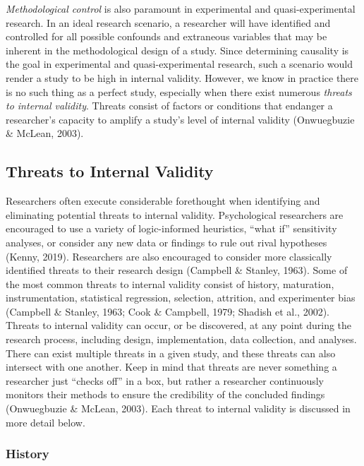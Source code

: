 \documentclass[
  11pt,
]{book}
\begin{document}
\emph{Methodological control} is also paramount in experimental and quasi-experimental research. In an ideal research scenario, a researcher will have identified and controlled for all possible confounds and extraneous variables that may be inherent in the methodological design of a study. Since determining causality is the goal in experimental and quasi-experimental research, such a scenario would render a study to be high in internal validity. However, we know in practice there is no such thing as a perfect study, especially when there exist numerous \emph{threats to internal validity}. Threats consist of factors or conditions that endanger a researcher's capacity to amplify a study's level of internal validity (Onwuegbuzie \& McLean, 2003).

\hypertarget{threats-to-internal-validity}{%
\subsection{Threats to Internal Validity}\label{threats-to-internal-validity}}

Researchers often execute considerable forethought when identifying and eliminating potential threats to internal validity. Psychological researchers are encouraged to use a variety of logic-informed heuristics, ``what if'' sensitivity analyses, or consider any new data or findings to rule out rival hypotheses (Kenny, 2019). Researchers are also encouraged to consider more classically identified threats to their research design (Campbell \& Stanley, 1963). Some of the most common threats to internal validity consist of history, maturation, instrumentation, statistical regression, selection, attrition, and experimenter bias (Campbell \& Stanley, 1963; Cook \& Campbell, 1979; Shadish et al., 2002). Threats to internal validity can occur, or be discovered, at any point during the research process, including design, implementation, data collection, and analyses. There can exist multiple threats in a given study, and these threats can also intersect with one another. Keep in mind that threats are never something a researcher just ``checks off'' in a box, but rather a researcher continuously monitors their methods to ensure the credibility of the concluded findings (Onwuegbuzie \& McLean, 2003). Each threat to internal validity is discussed in more detail below.

\hypertarget{history}{%
\subsubsection{History}\label{history}}
\end{document}

